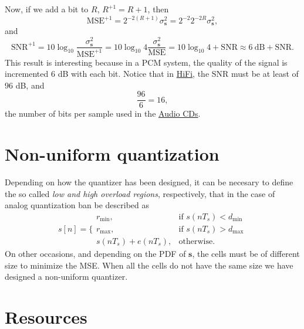 Now, if we add a bit to $R$, $R^{+1}=R+1$, then
\begin{equation*}
  \text{MSE}^{+1}=2^{-2(R+1)}\sigma_{\mathbf s} ^2 = 2^{-2}2^{-2R}\sigma_{\mathbf s}^2,
\end{equation*}
and
\begin{equation*}
  \text{SNR}^{+1} = 10\log_{10}\frac{\sigma_{\mathbf s}^2}{\text{MSE}^{+1}} = 10\log_{10}4\frac{\sigma_{\mathbf s}^2}{\text{MSE}} =
  10\log_{10} 4 + \text{SNR} \approx  6~\text{dB} + \text{SNR}.
\end{equation*}
This result is interesting because in a PCM system, the quality of
the signal is incremented $6$ dB with each bit. Notice that in
\href{https://en.wikipedia.org/wiki/High_fidelity}{HiFi}, the SNR
must be at least of $96$ dB, and
\begin{equation*}
  \frac{96}{6} = 16,
\end{equation*}
the number of bits per sample used in the
\href{https://en.wikipedia.org/wiki/Compact_disc}{Audio CDs}.

\section{Non-uniform quantization}

Depending on how the quantizer has been designed, it can be necesary to define the so called \emph{low and high overload
regions}, respectively, that in the case of analog quantization ban be described as
\begin{equation}
  s[n] = \{\begin{array}{ll}
  r_{\text{min}}, & \text{if $s(nT_s)<d_{\text{min}}$} \\
  r_{\text{max}}, & \text{if $s(nT_s)>d_{\text{max}}$} \\
  s(nT_s)+e(nT_s), & \text{otherwise}.
  \end{array}
\end{equation}
On other occasions, and depending on the PDF of ${\mathbf s}$, the
cells must be of different size to minimize the MSE. When all the
cells do not have the same size we have designed a non-uniform
quantizer.

\section{Resources}

